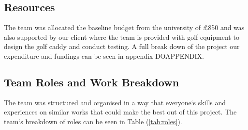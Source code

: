 \documentclass[11pt,landscape]{article}
\begin{document}
\begin{multicols}{3}
\subsection{Resources}
The team was allocated the baseline budget from the university of £850 and was
also supported by our client where the team is provided with golf equipment to
design the golf caddy and conduct testing. A full break down of the project our
expenditure and fundings can be seen in appendix DOAPPENDIX. 

\subsection{Team Roles and Work Breakdown}
The team was structured and organised in a way that everyone`s skills and
experiences on similar works that could make the best out of this project. The
team`s breakdown of roles can be seen in Table (\ref{tab:roles}). 

\begin{table}[H]
    \begin{center}
        \label{tab:roles}
    \end{center}
\end{table}


\end{multicols}
\end{document}
